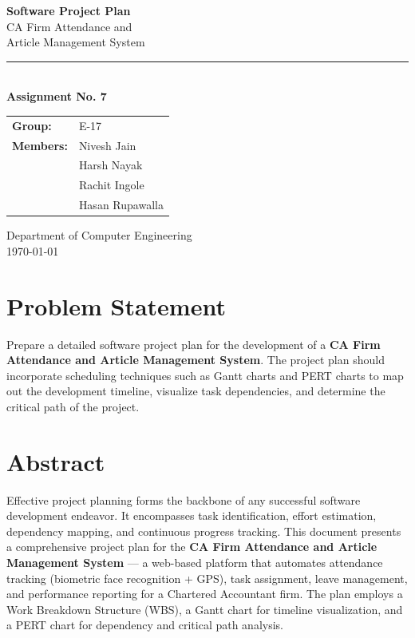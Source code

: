 \documentclass[12pt,a4paper]{article}
\begin{document}
\begin{titlepage}
\centering
\vspace*{2cm}
{\Huge\bfseries\color{headblue} Software Project Plan\\[12pt]}
{\LARGE CA Firm Attendance and\\Article Management System\\[20pt]}
\rule{0.6\textwidth}{1pt}\\[20pt]

{\large\textbf{Assignment No. 7}}\\[30pt]

\begin{tabular}{ll}
\textbf{Group:} & E-17 \\[4pt]
\textbf{Members:} & Nivesh Jain \\
 & Harsh Nayak \\
 & Rachit Ingole \\
 & Hasan Rupawalla \\
\end{tabular}

\vfill
{\small Department of Computer Engineering\\
\today}
\end{titlepage}

\section{Problem Statement}
Prepare a detailed software project plan for the development of a \textbf{CA Firm Attendance and Article Management System}. The project plan should incorporate scheduling techniques such as Gantt charts and PERT charts to map out the development timeline, visualize task dependencies, and determine the critical path of the project.

\section{Abstract}
Effective project planning forms the backbone of any successful software development endeavor. It encompasses task identification, effort estimation, dependency mapping, and continuous progress tracking. This document presents a comprehensive project plan for the \textbf{CA Firm Attendance and Article Management System} --- a web-based platform that automates attendance tracking (biometric face recognition + GPS), task assignment, leave management, and performance reporting for a Chartered Accountant firm. The plan employs a Work Breakdown Structure (WBS), a Gantt chart for timeline visualization, and a PERT chart for dependency and critical path analysis.
\end{document}
